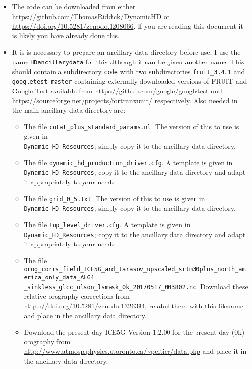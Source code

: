 \documentclass{article}
\begin{document}
\begin{itemize}
\item The code can be downloaded from either \url{https://github.com/ThomasRiddick/DynamicHD} or \url{https://doi.org/10.5281/zenodo.1208066}. If you are reading this document it is likely you have already done this.
\item It is is necessary to prepare an ancillary data directory before use; I use the name \lstinline[style=bash_input]{HDancillarydata} for this although it can be given another name. This should contain a subdirectory \lstinline[style=bash_input]{code} with two subdirectories \lstinline[style=bash_input]{fruit_3.4.1} and \lstinline[style=bash_input]{googletest-master} containing externally downloaded versions of FRUIT and Google Test available from \url{https://github.com/google/googletest} and \url{https://sourceforge.net/projects/fortranxunit/} respectively. Also needed in the main ancillary data directory are:
\begin{itemize}
\item The file \lstinline[style=bash_input]{cotat_plus_standard_params.nl}. The version of this to use is given in \\\lstinline[style=bash_input]{Dynamic_HD_Resources}; simply copy it to the ancillary data directory.
\item The file \lstinline[style=bash_input]{dynamic_hd_production_driver.cfg}. A template is given in \lstinline[style=bash_input]{Dynamic_HD_Resources}; copy it to the ancillary data directory and adapt it appropriately to your needs.
\item  The file \lstinline[style=bash_input]{grid_0_5.txt}. The version of this to use is given in \lstinline[style=bash_input]{Dynamic_HD_Resources}; simply copy it to the ancillary data directory.
\item The file  \lstinline[style=bash_input]{top_level_driver.cfg}. A template is given in \lstinline[style=bash_input]{Dynamic_HD_Resources}; copy it to the ancillary data directory and adapt it appropriately to your needs.
\item The file \lstinline[style=bash_input]{orog_corrs_field_ICE5G_and_tarasov_upscaled_srtm30plus_north_america_only_data_ALG4} \\\lstinline[style=bash_input]{_sinkless_glcc_olson_lsmask_0k_20170517_003802.nc}. Download these relative orography corrections from \url{ https://doi.org/10.5281/zenodo.1326394}, relabel them with this filename and place in the ancillary data directory.
\item Download the present day ICE5G Version 1.2.00 for the present day (0k) orography from \url{http://www.atmosp.physics.utoronto.ca/~peltier/data.php} and place it in the ancillary data directory.

\end{itemize}
\end{itemize}
\end{document}
